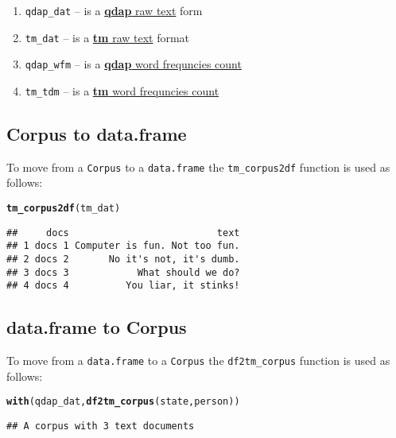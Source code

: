 \documentclass{article}\usepackage[]{graphicx}\usepackage[]{color}
\makeatletter
\newcommand{\hlstd}[1]{\textcolor[rgb]{0.345,0.345,0.345}{#1}}%
\newcommand{\hlkwd}[1]{\textcolor[rgb]{0.737,0.353,0.396}{\textbf{#1}}}%
\newenvironment{kframe}{%
 \def\at@end@of@kframe{}%
 \ifinner\ifhmode%
  \def\at@end@of@kframe{\end{minipage}}%
  \begin{minipage}{\columnwidth}%
 \fi\fi%
 \def\FrameCommand##1{\hskip\@totalleftmargin \hskip-\fboxsep
 \colorbox{shadecolor}{##1}\hskip-\fboxsep
     \hskip-\linewidth \hskip-\@totalleftmargin \hskip\columnwidth}%
 \MakeFramed {\advance\hsize-\width
   \@totalleftmargin\z@ \linewidth\hsize
   \@setminipage}}%
 {\par\unskip\endMakeFramed%
 \at@end@of@kframe}
\newenvironment{knitrout}{}{} %
\makeatother
\begin{document}
\begin{enumerate}
  \item \texttt{qdap\_dat} -- is a \underline{\textbf{qdap} raw text} form
  \item \texttt{tm\_dat} -- is a \underline{\textbf{tm} raw text} format
  \item \texttt{qdap\_wfm} -- is a \underline{\textbf{qdap} word frequncies count}
  \item \texttt{tm\_tdm} -- is a \underline{\textbf{tm} word frequncies count}
\end{enumerate}




\subsection{Corpus to data.frame}

To move from a \texttt{Corpus} to a \texttt{data.frame} the \texttt{tm\_corpus2df} function is used as follows:

\begin{knitrout}
\color{fgcolor}\begin{kframe}
\begin{alltt}
\hlkwd{tm_corpus2df}\hlstd{(tm_dat)}
\end{alltt}
\begin{verbatim}
##     docs                          text
## 1 docs 1 Computer is fun. Not too fun.
## 2 docs 2       No it's not, it's dumb.
## 3 docs 3            What should we do?
## 4 docs 4          You liar, it stinks!
\end{verbatim}
\end{kframe}
\end{knitrout}


\subsection{data.frame to Corpus}

To move from a \texttt{data.frame} to a \texttt{Corpus} the \texttt{df2tm\_corpus} function is used as follows:

\begin{knitrout}
\color{fgcolor}\begin{kframe}
\begin{alltt}
\hlkwd{with}\hlstd{(qdap_dat,} \hlkwd{df2tm_corpus}\hlstd{(state, person))}
\end{alltt}
\begin{verbatim}
## A corpus with 3 text documents
\end{verbatim}
\end{kframe}
\end{knitrout}
\end{document}
